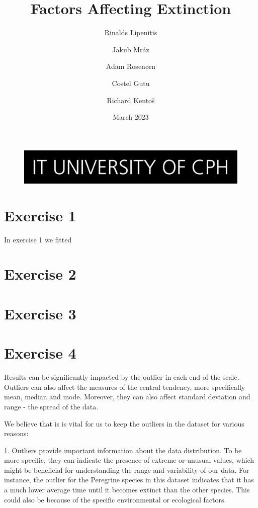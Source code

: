 \documentclass{article}
\begin{document}
\title{Factors Affecting Extinction}
\begin{figure}
    \includegraphics[width=\linewidth]{ITU.jpg}
\end{figure}
\maketitle
\author{Rinalds Lipenitis \and Jakub Mráz \and
Adam Rosenørn \and Costel Gutu \and Richard Kentoš}
\date{March 2023}

\newpage

\section{Exercise 1}
In exercise 1 we fitted 

\section{Exercise 2}

\section{Exercise 3}

\section{Exercise 4}
Results can be significantly impacted by the outlier in each end of the scale. Outliers can also affect the measures of the central tendency, more specifically mean, median and mode. Moreover, they can also affect standard deviation and range - the spread of the data.

We believe that is is vital for us to keep the outliers in the dataset for various reasons:

1. Outliers provide important information about the data distribution. To be more specific, they can indicate the presence of extreme or unusual values, which might be beneficial for understanding the range and variability of our data. For instance,  the outlier for the Peregrine species in this dataset indicates that it has a much lower average time until it becomes extinct than the other species. This could also be because of the specific environmental or ecological factors.
\end{document}

